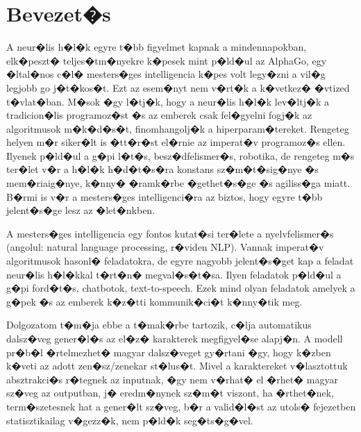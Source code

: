\documentclass[12pt]{report}
\theoremstyle{definition}
\begin{document}
\chapter*{Bevezet�s}

A neur�lis h�l�k egyre t�bb figyelmet kapnak a mindennapokban, elk�peszt� 
teljes�tm�nyekre k�pesek mint p�ld�ul az AlphaGo, egy �ltal�nos c�l� 
mesters�ges intelligencia k�pes volt legy�zni a vil�g legjobb go j�t�kos�t. Ezt 
az esem�nyt nem v�rt�k a k�vetkez� �vtized t�vlat�ban. M�sok �gy l�tj�k, hogy a 
neur�lis h�l�k lev�ltj�k a tradicion�lis programoz�st �s az emberek csak 
fel�gyelni fogj�k az algoritmusok m�k�d�s�t, finomhangolj�k a 
hiperparam�tereket. Rengeteg helyen m�r siker�lt is �tt�r�st el�rnie az 
imperat�v programoz�s ellen. Ilyenek p�ld�ul a g�pi l�t�s, besz�dfelismer�s, 
robotika, de rengeteg m�s ter�let v�r a h�l�k h�d�t�s�ra konstans 
sz�m�t�sig�nye �s mem�riaig�nye, k�nny� �ramk�rbe �gethet�s�ge �s agiliss�ga 
miatt. B�rmi is v�r a mesters�ges intelligenci�ra az biztos, hogy egyre t�bb 
jelent�s�ge lesz az �let�nkben.

A mesters�ges intelligencia egy fontos kutat�si ter�lete a nyelvfelismer�s 
(angolul: natural language processing, r�viden NLP). Vannak imperat�v 
algoritmusok hasonl� feladatokra, de egyre nagyobb jelent�s�get kap a feladat 
neur�lis h�l�kkal t�rt�n� megval�s�t�sa. Ilyen feladatok p�ld�ul a g�pi 
ford�t�s, chatbotok, text-to-speech. Ezek mind olyan feladatok amelyek a g�pek 
�s az emberek k�z�tti kommunik�ci�t k�nny�tik meg. 

Dolgozatom t�m�ja ebbe a t�mak�rbe tartozik, c�lja automatikus dalsz�veg 
gener�l�s az el�z� karakterek megfigyel�se alapj�n. A modell pr�b�l 
�rtelmezhet� magyar dalsz�veget gy�rtani �gy, hogy k�zben k�veti az adott 
zen�sz/zenekar st�lus�t. Mivel a karaktereket v�lasztottuk absztrakci�s 
r�tegnek az inputnak, �gy nem v�rhat� el �rhet� magyar sz�veg az outputban, j� 
eredm�nynek sz�m�t viszont, ha �rthet�nek, term�szetesnek hat a gener�lt 
sz�veg, b�r a valid�l�st az utols� fejezetben statisztikailag v�gezz�k, nem 
p�ld�k seg�ts�g�vel.
\end{document}
